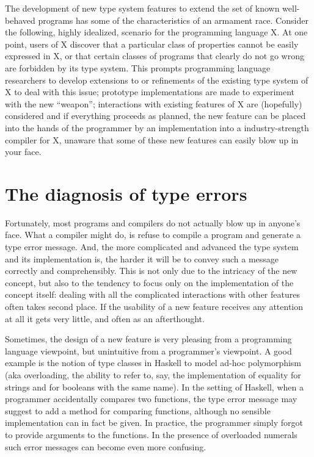 \documentclass[sigplan,10pt,noacm]{acmart}
\begin{document}
The development of new type system features to extend the set of known
well-behaved programs has some of the characteristics of an armament race.
Consider the following, highly idealized, scenario for the programming
language X.
At one point, users of X discover that a particular class of 
properties cannot be easily expressed in X, or that 
certain classes of programs that
clearly do not go wrong are forbidden by its type system.
This prompts programming language researchers to develop extensions to or
refinements of the existing type system of X to deal with this issue;
prototype implementations are made to experiment with the new ``weapon'';
interactions with existing features of X are (hopefully) considered and
if everything proceeds as planned, the new feature can be placed into the
hands of the programmer by an implementation into a industry-strength compiler
for X, unaware that some of these new features can easily blow up in 
your face.

\section{The diagnosis of type errors}

Fortunately, most programs and compilers do not actually blow up in anyone's 
face. What a compiler might do, is refuse to compile a program and generate a 
type error
message. And, the more complicated and advanced the type system and its
implementation is, the harder it will be to convey such a message
correctly and comprehensibly. This is not only due to 
the intricacy of the new concept, but also to the tendency
to focus only on the implementation of the concept itself: 
dealing with all the complicated interactions with other features often takes
second place. If the usability of a new feature receives any attention at all
it gets very little, and often as an afterthought.

Sometimes, the design
of a new feature is very pleasing from a programming language viewpoint, but
unintuitive from a programmer's viewpoint. A good example is the notion of
type classes in Haskell to model ad-hoc polymorphism (aka overloading, the 
ability to refer to, say, the implementation of equality for strings and for
booleans with the same name). In the setting of Haskell, when 
a programmer accidentally compares two functions, the type error message 
may suggest to add a method for comparing functions, although no sensible
implementation can in fact be given. 
In practice, the programmer simply forgot to provide 
arguments to the functions. In the presence of overloaded numerals such error messages 
can become even more confusing.
\end{document}

